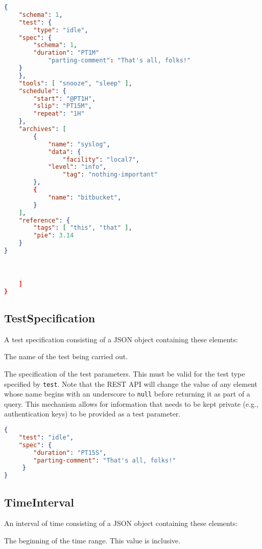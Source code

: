 \documentclass[10pt]{article}
\begin{document}
\example
\begin{lstlisting}[language=json]
{
    "schema": 1,
    "test": {
        "type": "idle",
	"spec": {
	    "schema": 1,
	    "duration": "PT1M"
            "parting-comment": "That's all, folks!"
	}
    },
    "tools": [ "snooze", "sleep" ],
    "schedule": {
        "start": "@PT1H",
        "slip": "PT15M",
        "repeat": "1H"
    },
    "archives": [
        {
            "name": "syslog",
            "data": {
                "facility": "local7",
        	"level": "info",
                "tag": "nothing-important"
        },
        {
            "name": "bitbucket",
        }
    ],
    "reference": {
        "tags": [ "this", "that" ],
        "pie": 3.14
    }
}



    ]
}
\end{lstlisting}




\subsection{TestSpecification}
A test specification consisting of a JSON object containing these
elements:

 The name of the test being carried out.

 The specification of the test parameters.
This must be valid for the test type specified by {\tt test}.  Note
that the REST API will change the value of any element whose name
begins with an underscore to {\tt null} before returning it as part of
a query.  This mechanism allows for information that needs to be kept
private (e.g., authentication keys) to be provided as a test
parameter.

\example
\begin{lstlisting}[language=json]
{
    "test": "idle",
    "spec": {
        "duration": "PT15S",
        "parting-comment": "That's all, folks!"
     }
}
\end{lstlisting}




\subsection{TimeInterval}
An interval of time consisting of a JSON object containing these
elements:

 The beginning of the time range.  This
value is inclusive.
\end{document}
